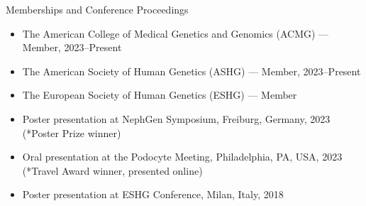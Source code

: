 \documentclass[
	11pt, %
]{resume} %
\begin{document}



\begin{rSection}{Memberships and Conference Proceedings}

\begin{itemize}
  \item The American College of Medical Genetics and Genomics (ACMG) — Member, 2023–Present
  \item The American Society of Human Genetics (ASHG) — Member, 2023–Present
  \item The European Society of Human Genetics (ESHG) — Member
  \item Poster presentation at NephGen Symposium, Freiburg, Germany, 2023 (*Poster Prize winner)
  \item Oral presentation at the Podocyte Meeting, Philadelphia, PA, USA, 2023 (*Travel Award winner, presented online)
  \item Poster presentation at ESHG Conference, Milan, Italy, 2018
\end{itemize}

\end{rSection}


\end{document}
